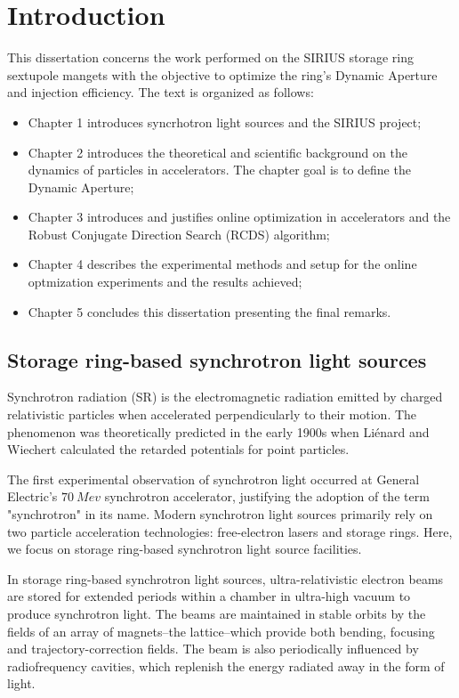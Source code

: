 \chapter{Introduction}
This dissertation concerns the work performed on the SIRIUS storage ring sextupole mangets with the objective to optimize the ring's Dynamic Aperture and injection efficiency. The text is organized as follows:
\begin{itemize}
    \item Chapter 1 introduces syncrhotron light sources and the SIRIUS project;
    \item Chapter 2 introduces the theoretical and scientific background on the dynamics of particles in accelerators. The chapter goal is to define the Dynamic Aperture;
    \item Chapter 3 introduces and justifies online optimization in accelerators and the Robust Conjugate Direction Search (RCDS) algorithm;
    \item Chapter 4 describes the experimental methods and setup for the online optmization experiments and the results achieved;
    \item Chapter 5 concludes this dissertation presenting the final remarks.
\end{itemize}

\section{Storage ring-based synchrotron light sources}
Synchrotron radiation (SR) is the electromagnetic radiation emitted by charged relativistic particles when accelerated perpendicularly to their motion. The phenomenon was theoretically predicted in the early 1900s when Liénard and Wiechert calculated the retarded potentials for point particles.

The first experimental observation of synchrotron light occurred at General Electric's $70~\unit{Mev}$ synchrotron accelerator, justifying the adoption of the term "synchrotron" in its name. Modern synchrotron light sources primarily rely on two particle acceleration technologies: free-electron lasers and storage rings. Here, we focus on storage ring-based synchrotron light source facilities.

In storage ring-based synchrotron light sources, ultra-relativistic electron beams are stored for extended periods within a chamber in ultra-high vacuum to produce synchrotron light. The beams are maintained in stable orbits by the fields of an array of magnets--the lattice--which provide both bending, focusing and trajectory-correction fields. The beam is also periodically influenced by radiofrequency cavities, which replenish the energy radiated away in the form of light.

